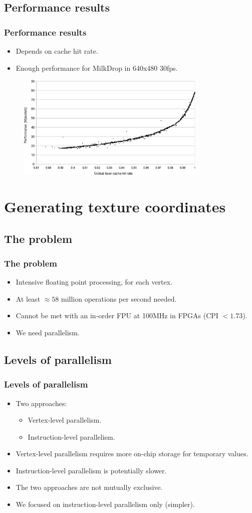 \documentclass{beamer}
\begin{document}
\subsection{Performance results}
\frame
{
  \frametitle{Performance results}
  \begin{itemize}
  \item Depends on cache hit rate.
  \item Enough performance for MilkDrop in 640x480 30fps.
  \end{itemize}
  \begin{figure}[H]
  \includegraphics[height=50mm]{tmuresult.eps}
  \end{figure}
}

\section{Generating texture coordinates}
\subsection{The problem}
\frame
{
  \frametitle{The problem}
  \begin{itemize}
  \item Intensive floating point processing, for each vertex.
  \item At least $\approx 58$ million operations per second needed.
  \item Cannot be met with an in-order FPU at 100MHz in FPGAs (CPI $< 1.73$).
  \item We need parallelism.
  \end{itemize}
}

\subsection{Levels of parallelism}
\frame
{
  \frametitle{Levels of parallelism}
  \begin{itemize}
  \item Two approaches:
  \begin{itemize}
  \item Vertex-level parallelism.
  \item Instruction-level parallelism.
  \end{itemize}
  \item Vertex-level parallelism requires more on-chip storage for temporary values.
  \item Instruction-level parallelism is potentially slower.
  \item The two approaches are not mutually exclusive.
  \item We focused on instruction-level parallelism only (simpler).
  \end{itemize}
}
\end{document}
